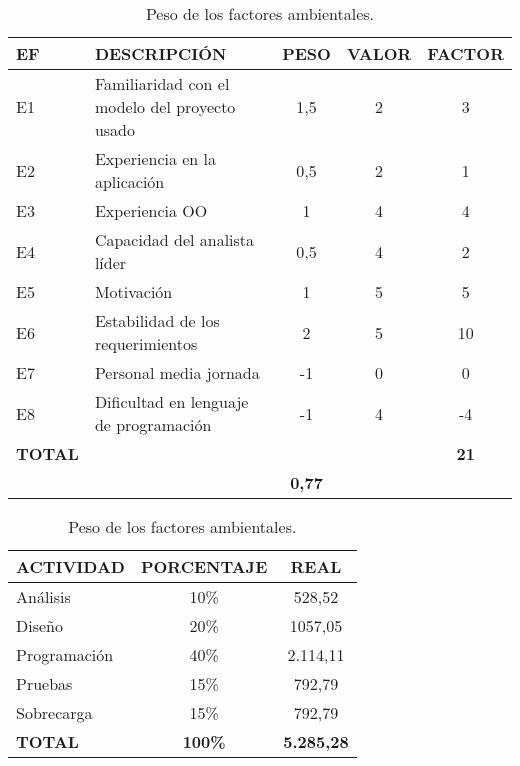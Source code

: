 \begin{table}[H]
\begin{center}
\begin{tabular}{l l c c c}
\textbf{EF} & \textbf{DESCRIPCIÓN} & \textbf{PESO} & \textbf{VALOR} & \textbf{FACTOR}\\ \hline \hline
E1	&	Familiaridad con el modelo del proyecto usado	&	1,5	&	2	&	3	\\
E2	&	Experiencia en la aplicación	&	0,5	&	2	&	1	\\
E3	&	Experiencia OO	&	1	&	4	&	4	\\
E4	&	Capacidad del analista líder	&	0,5	&	4	&	2	\\
E5	&	Motivación	&	1	&	5	&	5	\\
E6	&	Estabilidad de los requerimientos	&	2	&	5	&	10	\\
E7	&	Personal media jornada	&	-1	&	0	&	0	\\
E8	&	Dificultad en lenguaje de programación	&	-1	&	4	&	-4	\\ \hline
\textbf{TOTAL} & & & & \textbf{21}\\ \hline \hline
\multicolumn{2}{l}{}\textbf{Factores ambientales} & \textbf{0,77} & & \\ \hline \hline
\end{tabular}
\caption{Peso de los factores ambientales.}
\label{tab:ef}
\end{center}
\end{table}

\begin{table}[H]
\begin{center}
\begin{tabular}{l c c}
\textbf{ACTIVIDAD} & \textbf{PORCENTAJE} & \textbf{REAL}\\ \hline \hline
Análisis & 10\% & 528,52 \\
Diseño & 20\% & 1057,05 \\
Programación & 40\% & 2.114,11 \\
Pruebas & 15\% & 792,79 \\
Sobrecarga & 15\% & 792,79 \\ \hline
\textbf{TOTAL} & \textbf{100\%} & \textbf{5.285,28}\\ \hline \hline
\end{tabular}
\caption{Peso de los factores ambientales.}
\label{tab:porcentajeAct}
\end{center}
\end{table}
